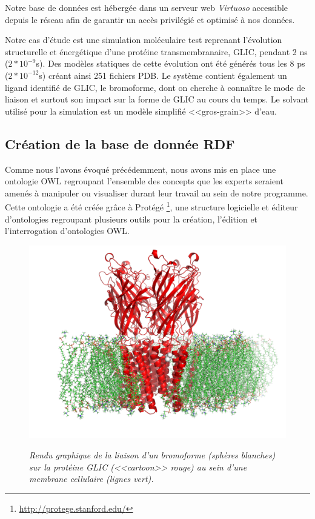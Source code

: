 Notre base de données est hébergée dans un serveur web \textit{Virtuoso} accessible depuis le réseau afin de garantir un accès privilégié et optimisé à nos données. 

Notre cas d'étude est une simulation moléculaire test reprenant l'évolution structurelle et énergétique d'une protéine transmembranaire, GLIC, pendant 2 ns ($2*10^{-9}$s). Des modèles statiques de cette évolution ont été générés tous les 8 ps ($2*10^{-12}$s) créant ainsi 251 fichiers PDB. Le système contient également un ligand identifié de GLIC, le bromoforme, dont on cherche à connaître le mode de liaison et surtout son impact sur la forme de GLIC au cours du temps. Le solvant utilisé pour la simulation est un modèle simplifié <<gros-grain>> d'eau. 

\subsection{Création de la base de donnée RDF}

Comme nous l'avons évoqué précédemment, nous avons mis en place une ontologie OWL regroupant l'ensemble des concepts que les experts seraient amenés à manipuler ou visualiser durant leur travail au sein de notre programme. Cette ontologie a été créée grâce à Protégé \footnote{\url{http://protege.stanford.edu/}}, une structure logicielle et éditeur d'ontologies regroupant plusieurs outils pour la création, l'édition et l'interrogation d'ontologies OWL.

\begin{figure}
  \centering
  {\includegraphics[width=.75\linewidth]{./figures/ch5/glic+bromoform.pdf}}
    \caption[Rendu graphique de GLIC et son ligand.]{{\it Rendu graphique de la liaison d'un bromoforme (sphères blanches) sur la protéine GLIC (<<cartoon>> rouge) au sein d'une membrane cellulaire (lignes vert).}}
  \label{Fig:glic+bromoform}
  \hspace{0.3cm}
\end{figure}


